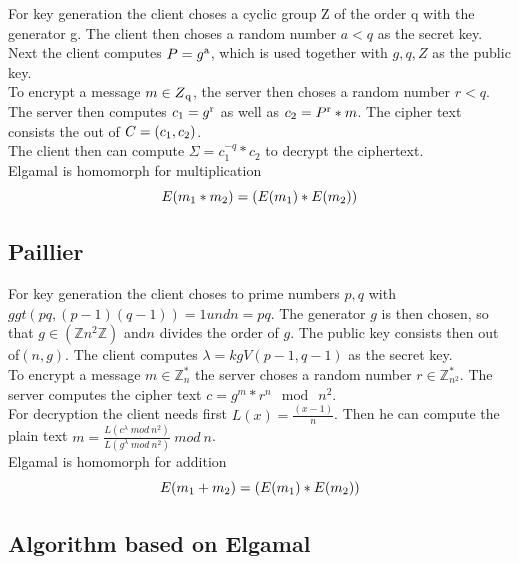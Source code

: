 \documentclass[10pt,a4paper,oneside,twocolumn]{article}
\begin{document}
For key generation the client choses a cyclic group Z of the order q with the generator g.
The client then choses a random number $a < q$ as the secret key.
Next the client computes $P = g\textsuperscript{a} $, which is used together with $g,q,Z$ as the public key. \\

To encrypt a message $m \in Z\textsubscript{q}$, the server then choses a random number $r < q$.
The server then computes  $c\textsubscript{1} = g\textsuperscript{r}$ as well as $c\textsubscript{2} =P \textsuperscript{r} *m$. The cipher text consists the out of $C = (c\textsubscript{1},c\textsubscript{2})$.\\

The client then can compute $\Sigma = c_{1}^{-q} * c_{2}$ to decrypt the ciphertext.\\

Elgamal is homomorph for multiplication
$$ E(m \textsubscript{1} * m \textsubscript{2}) = (E(m \textsubscript{1}) * E(m \textsubscript{2}))$$

\subsection{Paillier}
For key generation the client choses to prime numbers $p,q$ with $ ggt(pq, (p-1)(q-1))= 1 und n =pq $. The generator $g$ is then chosen, so that $ g \in (\mathbb{Z} n^{2} \mathbb{Z}) $ and$ n $ divides the order of $g$. The public key consists then out of$(n,g)$. The client computes  $ \lambda = kgV(p-1, q-1) $ as the secret key.\\

To encrypt a message $ m \in \mathbb{Z}_{n}^{*} $ the server choses a random number $ r  \in \mathbb{Z}_{n^{2}}^{*} $. The server computes the cipher text  $ c = g^{m}*r^{n} \mod\ n^{2} $.\\


For decryption the client needs first  $ L(x)= \frac{(x-1)}{n} $. Then he can compute the plain text  $ m = \frac{L(c^{\lambda} \ mod \ n^{2}) }{L(g^{\lambda} \ mod \ n^{2})} \ mod \ n $.\\

Elgamal is homomorph for addition
$$ E(m \textsubscript{1} + m \textsubscript{2}) = (E(m \textsubscript{1}) * E(m \textsubscript{2}))$$


\subsection{Algorithm based on Elgamal}
\end{document}
